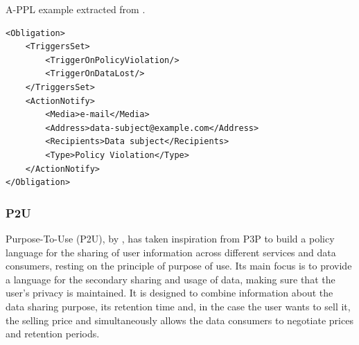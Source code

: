 \begin{listing}
\caption{A-PPL example extracted from \cite{azraoui_appl_2014}.}
\label{list:appl_example}
\begin{verbatim}
<Obligation>
    <TriggersSet>
        <TriggerOnPolicyViolation/>
        <TriggerOnDataLost/>
    </TriggersSet>
    <ActionNotify>
        <Media>e-mail</Media>
        <Address>data-subject@example.com</Address>
        <Recipients>Data subject</Recipients>
        <Type>Policy Violation</Type>
    </ActionNotify>
</Obligation>
\end{verbatim}
\end{listing}

\subsubsection{P2U}
\label{sec:p2u}

Purpose-To-Use (P2U), by \cite{iyilade_p2u_2014}, has taken inspiration from P3P to build a policy language for the sharing of user information across different services and data consumers, resting on the principle of purpose of use.
Its main focus is to provide a language for the secondary sharing and usage of data, making sure that the user's privacy is maintained.
It is designed to combine information about the data sharing purpose, its retention time and, in the case the user wants to sell it, the selling price and simultaneously allows the data consumers to negotiate prices and retention periods.

